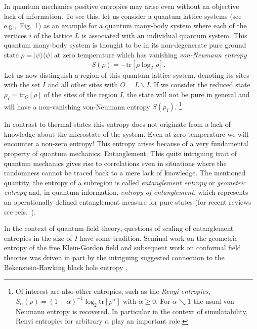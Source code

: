 \documentclass[rmp,twocolumn,floatfix,epsfig,graphics]{revtex4} %
\begin{document}
In quantum mechanics positive entropies may arise even without an 
objective lack of information. To see this, let us consider a 
quantum lattice systems (see e.g.,\ Fig.\ 1) as an example for a 
quantum many-body system where each of the vertices $i$ of 
the lattice $L$ is associated with an individual quantum system. 
This quantum many-body system is thought to be in its non-degenerate 
pure ground state $\rho=|\psi\rangle\langle\psi|$ at zero temperature
which has vanishing {\it von-Neumann entropy} 
\begin{equation*}
        S(\rho) = - \text{tr}[\rho \log_2 \rho].
\end{equation*}
Let us now distinguish a region of this quantum lattice 
system, denoting its sites with the set $I$ and all other 
sites with $O=L\backslash I$. If we consider the reduced state 
$\rho_I= \text{tr}_{O}[\rho]$ of the sites of the region $I$, 
the state will not be pure in general and will have a 
non-vanishing von-Neumann entropy $S(\rho_I)$.
\footnote{Of interest are also other entropies, such as the 
{\it Renyi entropies}, $S_\alpha(\rho) =(1-\alpha)^{-1} 
\log_2 \text{tr} [\rho^\alpha]$ with $\alpha\geq 0$. For 
$\alpha\searrow 1$ the usual von-Neumann entropy is recovered. 
In particular in the context of simulatability, Renyi entropies 
for arbitrary $\alpha$ play an important role.}

In contrast to thermal states this entropy does not originate 
from a lack of knowledge about the microstate of the system. 
Even at zero temperature we will encounter a non-zero 
entropy! This entropy arises because of a very fundamental property 
of quantum mechanics: Entanglement. This quite intriguing 
trait of quantum mechanics gives rise to correlations even
in situations where the randomness cannot be traced back 
to a mere lack of knowledge. The mentioned quantity, the entropy 
of a subregion is called {\it entanglement entropy} or  
{\it geometric entropy} and, in quantum information,
{\it entropy of entanglement}, which 
 represents an operationally defined entanglement 
measure for pure states (for recent reviews see refs.\ \cite{Horodecki,InHouseReview}).

In the context of quantum field theory, questions of scaling
of entanglement entropies  in the size of $I$ have some tradition. Seminal work on the 
geometric entropy of the free Klein-Gordon field 
\cite{Bombelli,Srednicki} and subsequent work on conformal field
theories \cite{Larsen,Callan,PreskillOld,Calabrese,HardStuff} was 
driven in part by the intriguing suggested connection to the 
Bekenstein-Hawking black hole entropy 
\cite{Bekenstein,Hawking74,BekensteinCP}. 
\end{document}

